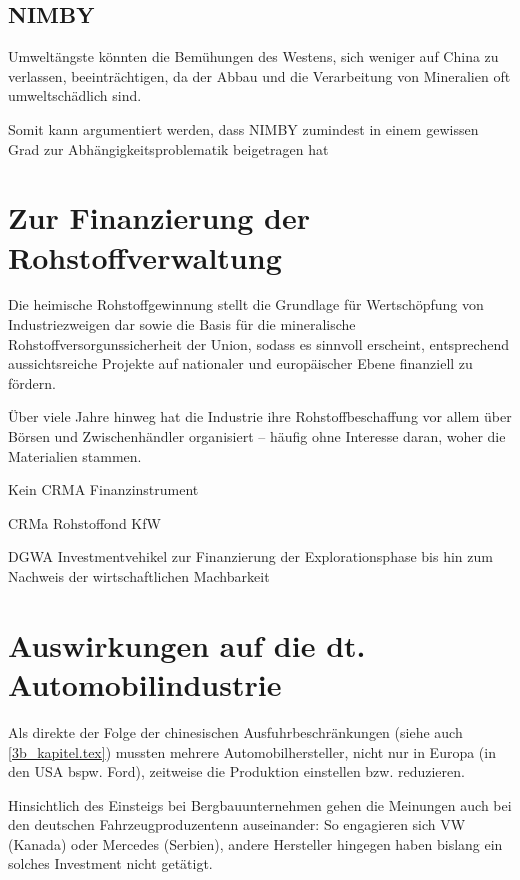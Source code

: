 \documentclass[12pt,a4paper,oneside]{book} %
\begin{document}
\subsection{NIMBY}

Umweltängste könnten die Bemühungen des Westens, sich weniger auf China zu verlassen, beeinträchtigen, da der Abbau und die Verarbeitung von Mineralien oft umweltschädlich sind.

Somit kann argumentiert werden, dass NIMBY zumindest in einem gewissen Grad zur Abhängigkeitsproblematik beigetragen hat

\section{Zur Finanzierung der Rohstoffverwaltung}

Die heimische Rohstoffgewinnung stellt die Grundlage für Wertschöpfung von Industriezweigen dar sowie die Basis für die mineralische Rohstoffversorgunssicherheit der Union, sodass es sinnvoll erscheint, entsprechend aussichtsreiche Projekte auf nationaler und europäischer Ebene finanziell zu fördern.\autocite{Commodity Top News 73, S. 14}

Über viele Jahre hinweg hat die Industrie ihre Rohstoffbeschaffung vor allem über Börsen und Zwischenhändler organisiert – häufig ohne Interesse daran, woher die Materialien stammen.\autocite{https://www.africa-business-guide.de/de/praxis/erfahrungen/schluesselrolle-afrikas-bedeutung-bei-den-kritischen-rohstoffen--1920084} 

Kein CRMA Finanzinstrument

CRMa Rohstoffond KfW

DGWA Investmentvehikel zur Finanzierung der Explorationsphase bis hin zum Nachweis der wirtschaftlichen Machbarkeit

\section{Auswirkungen auf die dt. Automobilindustrie}



Als direkte der Folge der chinesischen Ausfuhrbeschränkungen (siehe auch \ref{3b_kapitel.tex}) mussten mehrere Automobilhersteller, nicht nur in Europa (in den USA bspw. Ford\autocite{Naughton_Bloomberg}), zeitweise die Produktion einstellen bzw. reduzieren.

Hinsichtlich des Einsteigs bei Bergbauunternehmen gehen die Meinungen auch bei den deutschen Fahrzeugproduzentenn auseinander: So engagieren sich VW (Kanada) oder Mercedes (Serbien), andere Hersteller hingegen haben bislang ein solches Investment nicht getätigt.
\end{document}
